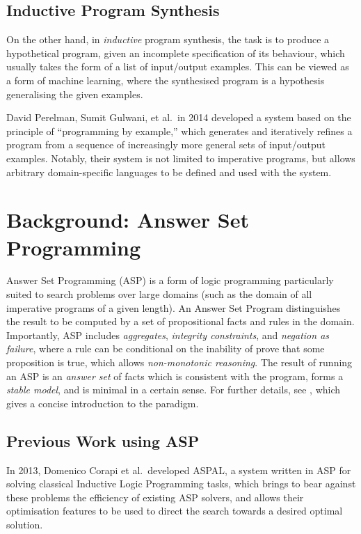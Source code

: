 \documentclass[a4paper,twoside,notitlepage]{report}
\begin{document}
\section{Inductive Program Synthesis}

On the other hand, in \emph{inductive} program synthesis, the task is to 
produce a hypothetical program, given an incomplete specification of its 
behaviour, which usually takes the form of a list of input/output examples. 
This can be viewed as a form of machine learning, where the synthesised 
program is a hypothesis generalising the given examples.

David Perelman, Sumit Gulwani, et al.\ in 2014 developed a system\cite{tds} 
based on the principle of ``programming by example,'' which generates and 
iteratively refines a program from a sequence of increasingly more general 
sets of input/output examples. Notably, their system is not limited to 
imperative programs, but allows arbitrary domain-specific languages to be 
defined and used with the system.

\chapter{Background: Answer Set Programming} \label{chp:bkgasp}

Answer Set Programming (ASP) is a form of logic programming particularly
suited to search problems over large domains (such as the domain of all
imperative programs of a given length). An Answer Set Program distinguishes
the result to be computed by a set of propositional facts and rules in the
domain. Importantly, ASP includes \emph{aggregates}, \emph{integrity
constraints}, and \emph{negation as failure}, where a rule can be conditional
on the inability of prove that some proposition is true, which allows
\emph{non-monotonic reasoning}. The result of running an ASP is an
\emph{answer set} of facts which is consistent with the program, forms a
\emph{stable model}, and is minimal in a certain sense. For further details,
see \cite{glimpse}, which gives a concise introduction to the paradigm.

\section{Previous Work using ASP}

In 2013, Domenico Corapi et al.\ developed ASPAL\cite{aspal}, a system written
in ASP for solving classical Inductive Logic Programming tasks, which brings
to bear against these problems the efficiency of existing ASP solvers, and
allows their optimisation features to be used to direct the search towards a
desired optimal solution.
\end{document}

